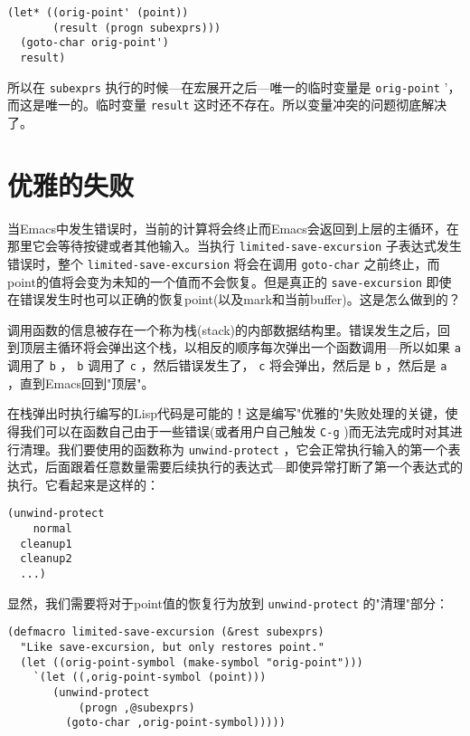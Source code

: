 \begin{verbatim}
(let* ((orig-point' (point))
       (result (progn subexprs)))
  (goto-char orig-point')
  result)
\end{verbatim}

所以在 \texttt{subexprs} 执行的时候---在宏展开之后---唯一的临时变量是 \texttt{orig-point} '，而这是唯一的。临时变量 \texttt{result} 这时还不存在。所以变量冲突的问题彻底解决了。

\section{优雅的失败}
\label{section:08-Failing-Gracefully}

当Emacs中发生错误时，当前的计算将会终止而Emacs会返回到上层的主循环，在那里它会等待按键或者其他输入。当执行 \texttt{limited-save-excursion} 子表达式发生错误时，整个 \texttt{limited-save-excursion} 将会在调用 \texttt{goto-char} 之前终止，而point的值将会变为未知的一个值而不会恢复。但是真正的 \texttt{save-excursion} 即使在错误发生时也可以正确的恢复point(以及mark和当前buffer)。这是怎么做到的？

调用函数的信息被存在一个称为栈(stack)的内部数据结构里。错误发生之后，回到顶层主循环将会弹出这个栈，以相反的顺序每次弹出一个函数调用---所以如果 \texttt{a} 调用了 \texttt{b} ， \texttt{b} 调用了 \texttt{c} ，然后错误发生了， \texttt{c} 将会弹出，然后是 \texttt{b} ，然后是 \texttt{a} ，直到Emacs回到"顶层"。

在栈弹出时执行编写的Lisp代码是可能的！这是编写"优雅的"失败处理的关键，使得我们可以在函数自己由于一些错误(或者用户自己触发 \verb|C-g| )而无法完成时对其进行清理。我们要使用的函数称为 \texttt{unwind-protect} ，它会正常执行输入的第一个表达式，后面跟着任意数量需要后续执行的表达式---即使异常打断了第一个表达式的执行。它看起来是这样的：

\begin{verbatim}
(unwind-protect
    normal
  cleanup1
  cleanup2
  ...)
\end{verbatim}

显然，我们需要将对于point值的恢复行为放到 \texttt{unwind-protect} 的"清理"部分：

\begin{verbatim}
(defmacro limited-save-excursion (&rest subexprs)
  "Like save-excursion, but only restores point."
  (let ((orig-point-symbol (make-symbol "orig-point")))
    `(let ((,orig-point-symbol (point)))
       (unwind-protect
           (progn ,@subexprs)
         (goto-char ,orig-point-symbol)))))
\end{verbatim}

